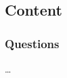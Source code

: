 \documentclass{i20lecture}
\begin{document}
\subsection{Content}

\begin{frame}
  \frametitle{\insertsection}
  \framesubtitle{\insertsubsection}

\end{frame}

\begin{frame}
  \frametitle{Questions}

  \begin{center}
    \LARGE \dots
  \end{center}

\end{frame}
\end{document}
